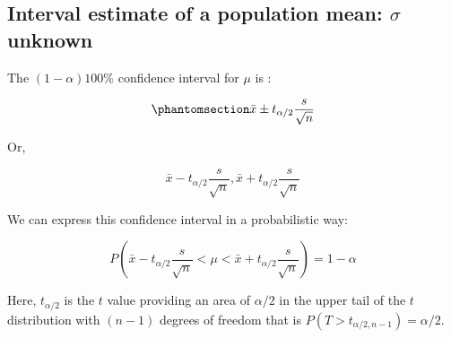 \documentclass[
  11pt,
  letterpaper,
  DIV=11,
  numbers=noendperiod]{scrreprt}
\begin{document}
\subsection{\texorpdfstring{Interval estimate of a population mean:
\(\sigma\)
unknown}{Interval estimate of a population mean: \textbackslash sigma unknown}}\label{interval-estimate-of-a-population-mean-sigma-unknown}

The \((1-\alpha)100\%\) confidence interval for \(\mu\) is :

\begin{equation}\phantomsection\label{eq-9.2}{\bar x \pm t_{\alpha/2} \frac{s}{\sqrt n}}\end{equation}

Or,

\[\bar x-t_{\alpha/2}\frac {s}{\sqrt n}, \bar x+t_{\alpha/2}\frac {s}{\sqrt n}\]

We can express this confidence interval in a probabilistic way:

\[P\left( \bar x-t_{\alpha/2}\frac{s}{\sqrt n}<\mu<\bar x+t_{\alpha/2}\frac{s}{\sqrt n}  \right)=1-\alpha\]

Here, \(t_{\alpha/2}\) is the \(t\) value providing an area of
\(\alpha/2\) in the upper tail of the \(t\) distribution with \((n-1)\)
degrees of freedom that is \(P(T>t_{\alpha/2,n-1})=\alpha/2\).
\end{document}

